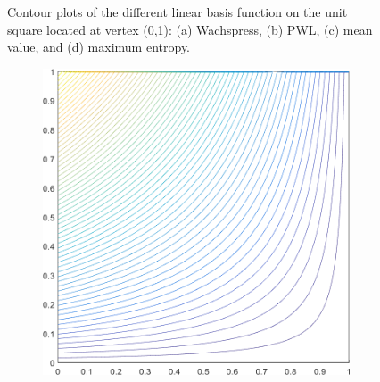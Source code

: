 \begin{figure}
\begin{subfigure}[b]{0.39\textwidth}
		\caption{}
	\end{subfigure}
\caption[Contour plots of the linear basis functions on the unit square.]{Contour plots of the different linear basis function on the unit square located at vertex (0,1): (a) Wachspress, (b) PWL, (c) mean value, and (d) maximum entropy.}
\end{figure}

\begin{figure}
\label{fig::2D_Summary_deg_square_basis_functions}
\centering
	\begin{subfigure}[b]{0.39\textwidth}
		\centering
		\includegraphics[width=\textwidth]{figures/sec_BF/deg_square_WACHSPRESS1_contour_b5.png}
		\caption{}
	\end{subfigure}
	\hspace{1.5cm}
	\begin{subfigure}[b]{0.39\textwidth}
		\centering

\end{subfigure}
\end{figure}

